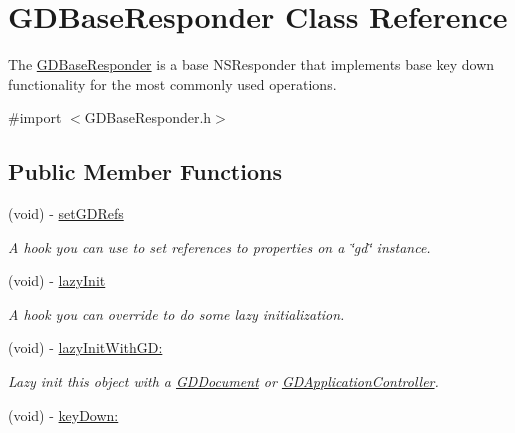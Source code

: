 \hypertarget{interface_g_d_base_responder}{
\section{GDBaseResponder Class Reference}
\label{interface_g_d_base_responder}
}


The \hyperlink{interface_g_d_base_responder}{GDBaseResponder} is a base NSResponder that implements base key down functionality for the most commonly used operations.  


{\ttfamily \#import $<$GDBaseResponder.h$>$}\subsection*{Public Member Functions}
\begin{DoxyCompactItemize}
\item 
\hypertarget{interface_g_d_base_responder_aa823aa31d254329111901d4e4c281b0d}{
(void) -\/ \hyperlink{interface_g_d_base_responder_aa823aa31d254329111901d4e4c281b0d}{setGDRefs}}
\label{interface_g_d_base_responder_aa823aa31d254329111901d4e4c281b0d}

\begin{DoxyCompactList}\small\item\em A hook you can use to set references to properties on a \char`\"{}gd\char`\"{} instance. \item\end{DoxyCompactList}\item 
(void) -\/ \hyperlink{interface_g_d_base_responder_a41c0ac5bc661491a77d3e92cbdb1ba27}{lazyInit}
\begin{DoxyCompactList}\small\item\em A hook you can override to do some lazy initialization. \item\end{DoxyCompactList}\item 
(void) -\/ \hyperlink{interface_g_d_base_responder_a395637f6f067d9d84ec073bd3b1af0ac}{lazyInitWithGD:}
\begin{DoxyCompactList}\small\item\em Lazy init this object with a \hyperlink{interface_g_d_document}{GDDocument} or \hyperlink{interface_g_d_application_controller}{GDApplicationController}. \item\end{DoxyCompactList}\item 
\hypertarget{interface_g_d_base_responder_a23446728999e7c6b783eb6787fe3a3b8}{
(void) -\/ \hyperlink{interface_g_d_base_responder_a23446728999e7c6b783eb6787fe3a3b8}{keyDown:}}
\label{interface_g_d_base_responder_a23446728999e7c6b783eb6787fe3a3b8}


\end{DoxyCompactItemize}
